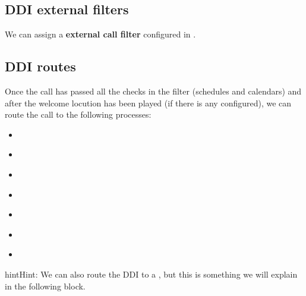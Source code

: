 \documentclass[letterpaper,10pt,english]{sphinxmanual}
\begin{document}
\subsection{DDI external filters}
\label{company/ddis:ddi-external-filters}
We can assign a \textbf{external call filter} configured in {\hyperref[company/external_filters:external\string-call\string-filters]{}}.

\noindent{}


\subsection{DDI routes}
\label{company/ddis:routing-logics}\label{company/ddis:ddi-routes}
Once the call has passed all the checks in the filter (schedules and calendars)
and after the welcome locution has been played (if there is any configured),
we can route the call to the following processes:
\begin{itemize}
\item {} 
{\hyperref[company/users:users]{}}

\item {} 
{\hyperref[company/huntgroups:huntgroups]{}}

\item {} 
{\hyperref[company/ivrs:ivrs]{}}

\item {} 
{\hyperref[company/conference_rooms:conference\string-rooms]{}}

\item {} 
{\hyperref[company/conditional_routes:conditional\string-routes]{}}

\item {} 
{\hyperref[company/queues:queues]{}}

\item {} 
{\hyperref[company/friends:friends]{}}

\end{itemize}

\begin{notice}{hint}{Hint:}
We can also route the DDI to a {\hyperref[company/faxing:faxing\string-system]{}}, but
this is something we will explain in the following block.
\end{notice}
\end{document}
